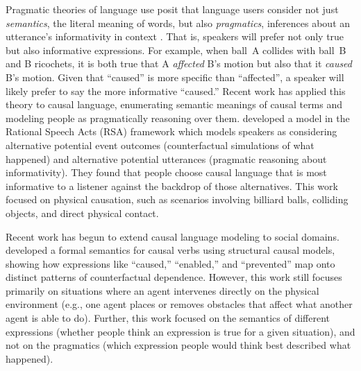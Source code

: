 \documentclass[10pt,letterpaper]{article}
\begin{document}
Pragmatic theories of language use posit that language users consider not just \textit{semantics}, the literal meaning of words, but also \textit{pragmatics}, inferences about an utterance's informativity in context \citep{grice1975logic}. 
That is, speakers will prefer not only true but also informative expressions. For example, when ball~A collides with ball~B and B ricochets, it is both true that A \emph{affected} B's motion but also that it \emph{caused} B's motion. Given that ``caused'' is more specific than ``affected'', a speaker will likely prefer to say the more informative ``caused.''
Recent work has applied this theory to causal language, enumerating semantic meanings of causal terms and modeling people as pragmatically reasoning over them.
\citet{beller2025language} developed a model in the Rational Speech Acts (RSA) framework \citep{frank_predicting_2012,degen2023rational} which models speakers as considering alternative potential event outcomes (counterfactual simulations of what happened) and alternative potential utterances (pragmatic reasoning about informativity). 
They found that people choose causal language that is most informative to a listener against the backdrop of those alternatives. 
This work focused on physical causation, such as scenarios involving billiard balls, colliding objects, and direct physical contact. 

Recent work has begun to extend causal language modeling to social domains. 
\citet{cao_semantics_2023} developed a formal semantics for causal verbs using structural causal models, showing how expressions like ``caused,'' ``enabled,'' and ``prevented'' map onto distinct patterns of counterfactual dependence. 
However, this work still focuses primarily on situations where an agent intervenes directly on the physical environment (e.g., one agent places or removes obstacles that affect what another agent is able to do). Further, this work focused on the semantics of different expressions (whether people think an expression is true for a given situation), and not on the pragmatics (which expression people would think best described what happened). 


\end{document}
